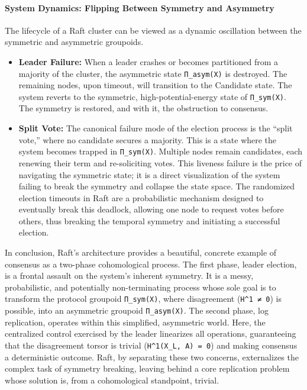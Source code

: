 \documentclass[
]{article}
\begin{document}
\paragraph{System Dynamics: Flipping Between Symmetry and
Asymmetry}\label{system-dynamics-flipping-between-symmetry-and-asymmetry}

The lifecycle of a Raft cluster can be viewed as a dynamic oscillation
between the symmetric and asymmetric groupoids.

\begin{itemize}
\item
  \textbf{Leader Failure:} When a leader crashes or becomes partitioned
  from a majority of the cluster, the asymmetric state
  \texttt{Π\_asym(X)} is destroyed. The remaining nodes, upon timeout,
  will transition to the Candidate state. The system reverts to the
  symmetric, high-potential-energy state of \texttt{Π\_sym(X)}. The
  symmetry is restored, and with it, the obstruction to consensus.
\item
  \textbf{Split Vote:} The canonical failure mode of the election
  process is the ``split vote,'' where no candidate secures a majority.
  This is a state where the system becomes trapped in
  \texttt{Π\_sym(X)}. Multiple nodes remain candidates, each renewing
  their term and re-soliciting votes. This liveness failure is the price
  of navigating the symmetric state; it is a direct visualization of the
  system failing to break the symmetry and collapse the state space. The
  randomized election timeouts in Raft are a probabilistic mechanism
  designed to eventually break this deadlock, allowing one node to
  request votes before others, thus breaking the temporal symmetry and
  initiating a successful election.
\end{itemize}

In conclusion, Raft's architecture provides a beautiful, concrete
example of consensus as a two-phase cohomological process. The first
phase, leader election, is a frontal assault on the system's inherent
symmetry. It is a messy, probabilistic, and potentially non-terminating
process whose sole goal is to transform the protocol groupoid
\texttt{Π\_sym(X)}, where disagreement (\texttt{H\^{}1\ ≠\ 0}) is
possible, into an asymmetric groupoid \texttt{Π\_asym(X)}. The second
phase, log replication, operates within this simplified, asymmetric
world. Here, the centralized control exercised by the leader linearizes
all operations, guaranteeing that the disagreement torsor is trivial
(\texttt{H\^{}1(X\_L,\ A)\ =\ 0}) and making consensus a deterministic
outcome. Raft, by separating these two concerns, externalizes the
complex task of symmetry breaking, leaving behind a core replication
problem whose solution is, from a cohomological standpoint, trivial.
\end{document}
